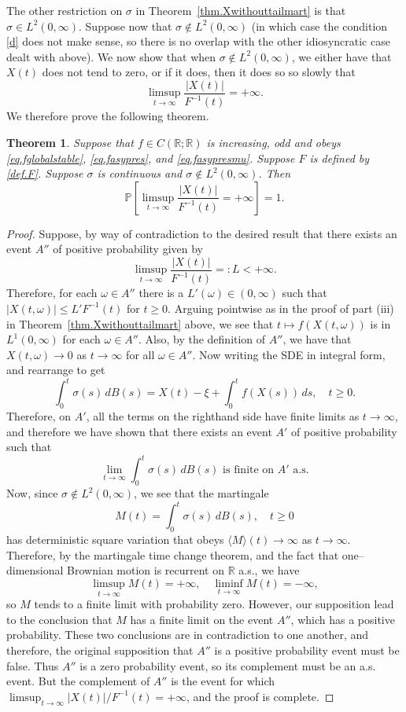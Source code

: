\documentclass[a4paper,10pt,reqno]{amsart}
\numberwithin{equation}{section}
\newtheorem{theorem}{Theorem}
\theoremstyle{definition}
\theoremstyle{remark}
\DeclareMathOperator{\1}{\mathbbm 1}
\begin{document}
	The other restriction on $\sigma$ in Theorem~\ref{thm.Xwithouttailmart} is that $\sigma\in L^2(0,\infty)$. Suppose now that $\sigma\not\in L^2(0,\infty)$ (in which case the condition \eqref{d} does not make sense, so there is no overlap with the other idiosyncratic case dealt with above). 
	We now show that when $\sigma\not\in L^2(0,\infty)$, we either have that $X(t)$ does not tend to zero, or if it does, then it does so so slowly that 
	\[
	\limsup_{t\to\infty} \frac{|X(t)|}{F^{-1}(t)}=+\infty.
	\] 
	We therefore prove the following theorem. 
	\begin{theorem} \label{thm.Xwithouttailmart2}
		Suppose that $f\in C(\mathbb{R};\mathbb{R})$ is increasing, odd and obeys \eqref{eq.fglobalstable}, \eqref{eq.fasypres}, and \eqref{eq.fasypresmu}. Suppose $F$ is defined by \eqref{def.F}. 
		Suppose $\sigma$ is continuous and $\sigma \not \in L^2(0,\infty)$.  
		Then 
		\[
		\mathbb{P}\left[ \limsup_{t \to \infty} \frac{|X(t)|}{F^{-1}(t)} =+\infty \right] = 1.
		\]
	\end{theorem}
	\begin{proof}
		Suppose, by way of contradiction to the desired result that there exists an event $A''$ of positive probability given by  
		\[
		\limsup_{t \to \infty} \frac{|X(t)|}{F^{-1}(t)}=:L<+\infty.
		\]
		Therefore, for each $\omega\in A''$ there is a $L'(\omega)\in (0,\infty)$ such that $|X(t,\omega)|\leq L' F^{-1}(t)$ for $t\geq 0$. Arguing pointwise as in the proof of part (iii) in Theorem~\ref{thm.Xwithouttailmart} above, we see that $t\mapsto f(X(t,\omega))$ is in $L^1(0,\infty)$ for each $\omega\in A''$. Also, by the definition of $A''$, we have that $X(t,\omega)\to 0$ as $t\to\infty$ for all $\omega\in A''$. Now writing the SDE in integral form, and rearrange to get
		\[
		\int_0^t \sigma(s)\,dB(s)=X(t)-\xi + \int_0^t f(X(s))\,ds, \quad t\geq 0.  
		\] 
		Therefore, on $A'$, all the terms on the righthand side have finite limits as $t\to\infty$, and therefore we have shown that there exists an event $A'$ of positive probability such that 
		\[
		\lim_{t\to\infty} \int_0^t \sigma(s)\,dB(s) \text{ is finite on $A'$ a.s.}
		\]
		Now, since $\sigma\not\in L^2(0,\infty)$, we see that the martingale
		\[
		M(t)=\int_0^t \sigma(s)\,dB(s), \quad t\geq 0
		\] 
		has deterministic square variation that obeys $\langle M\rangle(t)\to\infty$ as $t\to\infty$. Therefore, by the martingale time change theorem, and the fact that one--dimensional Brownian motion is recurrent on $\mathbb{R}$ a.s., we have 
		\[
		\limsup_{t\to\infty} M(t)=+\infty, \quad \liminf_{t\to\infty} M(t)=-\infty,
		\]
		so $M$ tends to a finite limit with probability zero. However, our supposition lead to the conclusion that $M$ has a finite limit on the event $A''$, which has a positive probability. These two conclusions are in contradiction to one another, and therefore, the original supposition that $A''$ is a positive probability event must be false. Thus $A''$ is a zero probability event, so its complement must be an a.s. event. But the complement of $A''$ is the event for which $\limsup_{t\to\infty} |X(t)|/F^{-1}(t)=+\infty$, and the proof is complete.
	\end{proof}
	
\end{document}
